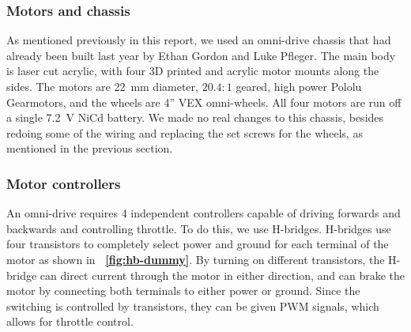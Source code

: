 \documentclass[letterpaper, 11pt]{article}
\newcommand*{\figref}[1]{\textbf{\figurename~\ref{#1}}}
\begin{document}
\begin{enumerate}[label=\textbf{\arabic*.}]
\subsubsection{Motors and chassis}
As mentioned previously in this report, we used an omni-drive chassis that had already been built last year by Ethan Gordon and Luke Pfleger. The main body is laser cut acrylic, with four 3D printed and acrylic motor mounts along the sides. The motors are \SI{22}{mm} diameter, $20.4:1$ geared, high power Pololu Gearmotors, and the wheels are 4'' VEX omni-wheels. All four motors are run off a single \SI{7.2}{\volt} NiCd battery. We made no real changes to this chassis, besides redoing some of the wiring and replacing the set screws for the wheels, as mentioned in the previous section.

\subsubsection{Motor controllers}
\label{sec:hbridge}
An omni-drive requires 4 independent controllers capable of driving forwards and backwards and controlling throttle. To do this, we use H-bridges. H-bridges use four transistors to completely select power and ground for each terminal of the motor as shown in \figref{fig:hb-dummy}. By turning on different transistors, the H-bridge can direct current through the motor in either direction, and can brake the motor by connecting both terminals to either power or ground. Since the switching is controlled by transistors, they can be given PWM signals, which allows for throttle control.


\end{enumerate}
\end{document}

